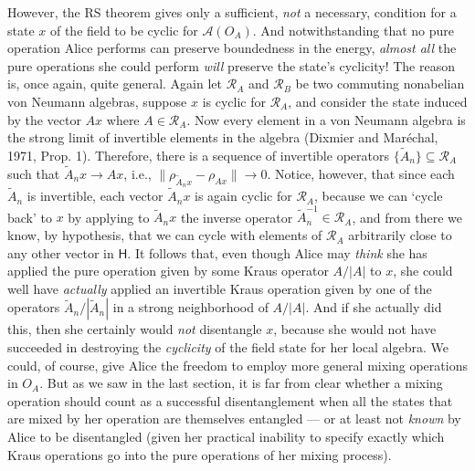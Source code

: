 \documentclass[12pt]{article}
\newcommand{\alg}[1]{\mbox{$\mathcal{#1}$}}
\newcommand{\hil}[1]{\mbox{$\mathsf{#1}$}}
\begin{document}
However, the RS theorem gives only a sufficient, \emph{not} a 
necessary, condition for a 
state $x$ of the field to be cyclic for $\alg{A}(O_{A})$.   And 
notwithstanding that no pure operation Alice performs can preserve boundedness in 
the energy, \emph{almost all} the pure operations she could perform \emph{will} preserve the 
state's cyclicity!  The reason is, 
once again, quite general. Again let $\alg{R}_{A}$ and 
$\alg{R}_{B}$ be two commuting nonabelian von Neumann algebras,  
suppose $x$ is cyclic for $\alg{R}_{A}$, and consider the state 
induced by the vector 
$Ax$ 
where $A\in \alg{R}_{A}$.  Now every element in a von Neumann algebra is 
the strong limit of invertible elements in the algebra (Dixmier and 
Mar\'{e}chal, 1971, Prop. 1).  Therefore, there is a sequence of 
invertible operators $\{\tilde{A}_{n}\}\subseteq \alg{R}_{A}$ such that 
$\tilde{A}_{n}x\rightarrow Ax$, i.e., $\|\rho_{\tilde{A}_{n}x}-
\rho_{Ax}\|\rightarrow 0$.  Notice, however, that since each $\tilde{A}_{n}$ is 
invertible, each vector $\tilde{A}_{n}x$ is again cyclic for 
$\alg{R}_{A}$, 
because we can `cycle back' to $x$ by applying to 
$\tilde{A}_{n}x$ the 
inverse operator $\tilde{A}_{n}^{-1}\in\alg{R}_{A}$, and 
from there we know, by hypothesis, that we can cycle with elements of $\alg{R}_{A}$ arbitrarily 
close to any other vector in 
$\hil{H}$.   It follows that, even 
though 
Alice may \emph{think} she has applied the pure operation given by 
some Kraus operator $A/|A|$ 
to $x$, she 
could well have \emph{actually} applied an invertible Kraus operation given by one of 
the operators $\tilde{A}_{n}/|\tilde{A}_{n}|$ 
in a strong neighborhood of $A/|A|$.  And if she actually did this, then she 
certainly would \emph{not} disentangle $x$, because she would not have 
succeeded in destroying the \emph{cyclicity} of the field state for her local algebra.
We could, of course, give Alice the 
freedom to employ more general mixing operations in $O_{A}$.  But as we saw in the last 
section, it is far from
clear whether a mixing operation should count as a successful 
disentanglement when all the states that are mixed by her operation are 
themselves 
entangled --- or at least not \emph{known} by Alice to be disentangled (given her 
practical inability to specify exactly which Kraus operations go into
the pure operations of her mixing process).  
\end{document}
